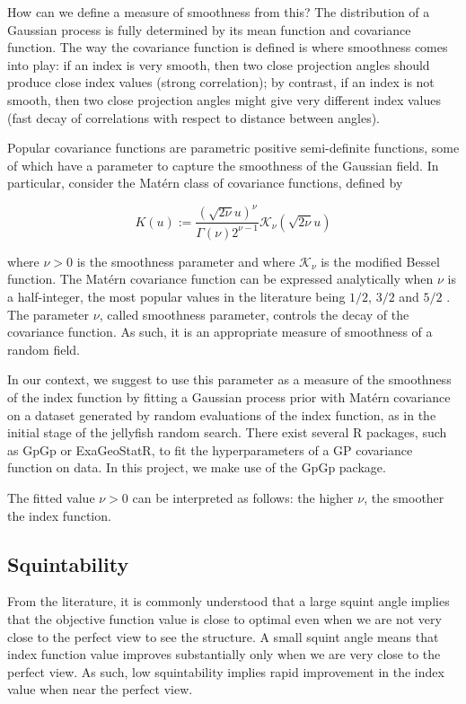 \documentclass[
  number,
  preprint,
  3p]{elsarticle}
\begin{document}
How can we define a measure of smoothness from this? The distribution of
a Gaussian process is fully determined by its mean function and
covariance function. The way the covariance function is defined is where
smoothness comes into play: if an index is very smooth, then two close
projection angles should produce close index values (strong
correlation); by contrast, if an index is not smooth, then two close
projection angles might give very different index values (fast decay of
correlations with respect to distance between angles).

Popular covariance functions are parametric positive semi-definite
functions, some of which have a parameter to capture the smoothness of
the Gaussian field. In particular, consider the Matérn class of
covariance functions, defined by

\[
K(u):=\frac{(\sqrt{2\nu}u)^{\nu}}{\Gamma(\nu)2^{\nu-1}}\mathcal{K}_{\nu}(\sqrt{2\nu}u)
\]

where \(\nu>0\) is the smoothness parameter and where
\(\mathcal{K}_\nu\) is the modified Bessel function. The Matérn
covariance function can be expressed analytically when \(\nu\) is a
half-integer, the most popular values in the literature being \(1/2\),
\(3/2\) and \(5/2\) . The parameter \(\nu\), called smoothness
parameter, controls the decay of the covariance function. As such, it is
an appropriate measure of smoothness of a random field.

In our context, we suggest to use this parameter as a measure of the
smoothness of the index function by fitting a Gaussian process prior
with Matérn covariance on a dataset generated by random evaluations of
the index function, as in the initial stage of the jellyfish random
search. There exist several R packages, such as GpGp or ExaGeoStatR, to
fit the hyperparameters of a GP covariance function on data. In this
project, we make use of the GpGp package.

The fitted value \(\nu>0\) can be interpreted as follows: the higher
\(\nu\), the smoother the index function.

\hypertarget{sec-squintability}{%
\subsection{Squintability}\label{sec-squintability}}

From the literature, it is commonly understood that a large squint angle
implies that the objective function value is close to optimal even when
we are not very close to the perfect view to see the structure. A small
squint angle means that index function value improves substantially only
when we are very close to the perfect view. As such, low squintability
implies rapid improvement in the index value when near the perfect view.
\end{document}
